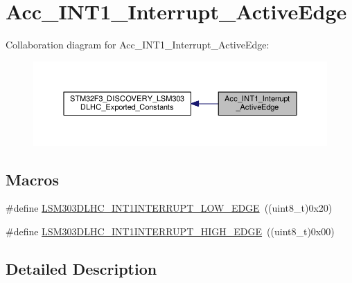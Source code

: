 \hypertarget{group__Acc__INT1__Interrupt__ActiveEdge}{\section{Acc\+\_\+\+I\+N\+T1\+\_\+\+Interrupt\+\_\+\+Active\+Edge}
\label{group__Acc__INT1__Interrupt__ActiveEdge}
}
Collaboration diagram for Acc\+\_\+\+I\+N\+T1\+\_\+\+Interrupt\+\_\+\+Active\+Edge\+:\nopagebreak
\begin{figure}[H]
\begin{center}
\leavevmode
\includegraphics[width=350pt]{group__Acc__INT1__Interrupt__ActiveEdge}
\end{center}
\end{figure}
\subsection*{Macros}
\begin{DoxyCompactItemize}
\item 
\#define \hyperlink{group__Acc__INT1__Interrupt__ActiveEdge_ga88df48ae3345518861ed50d6bf9b18b2}{L\+S\+M303\+D\+L\+H\+C\+\_\+\+I\+N\+T1\+I\+N\+T\+E\+R\+R\+U\+P\+T\+\_\+\+L\+O\+W\+\_\+\+E\+D\+G\+E}~((uint8\+\_\+t)0x20)
\item 
\#define \hyperlink{group__Acc__INT1__Interrupt__ActiveEdge_ga37e978e9a2b289e885c6982ba8181f1c}{L\+S\+M303\+D\+L\+H\+C\+\_\+\+I\+N\+T1\+I\+N\+T\+E\+R\+R\+U\+P\+T\+\_\+\+H\+I\+G\+H\+\_\+\+E\+D\+G\+E}~((uint8\+\_\+t)0x00)
\end{DoxyCompactItemize}


\subsection{Detailed Description}


